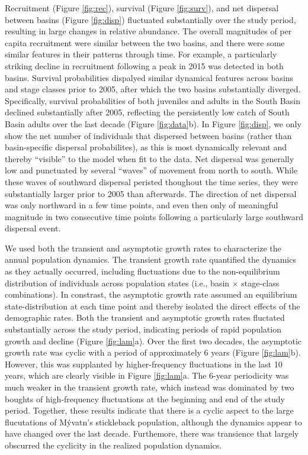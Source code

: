 \documentclass[11pt]{article}
\begin{document}
Recruitment (Figure \ref{fig:rec}), 
survival (Figure \ref{fig:surv}), 
and net dispersal between basins (Figure \ref{fig:disp})
fluctuated substantially over the study period,
resulting in large changes in relative abundance. 
The overall magnitudes of per capita recruitment were similar between the two basins,
and there were some similar features in their patterns through time.
For example, a particularly striking decline in recruitment following a peak in 2015
was detected in both basins.
Survival probabilities dispalyed similar dynamical features 
across basins and stage classes prior to 2005,
after which the two basins substantially diverged.
Specifically, survival probabilities of both juveniles and adults in the South Basin
declined substantially after 2005, 
reflecting the persistently low catch of South Basin adults over the last decade 
(Figure \ref{fig:data}b).
In Figure \ref{fig:disp}, we only show the net number of individuals
that dispersed between basins (rather than basin-specific dispersal probabilites),
as this is most dynamically relevant and thereby ``visible'' to the model when fit to the data.
Net dispersal was generally low and punctuated by several ``waves'' of movement from 
north to south. 
While these waves of southward dispersal peristed thoughout the time series,
they were substantially larger prior to 2005 than afterwards.
The direction of net dispersal was only northward in a few time points, 
and even then only of meaningful magnitude in two consecutive time points 
following a particularly large southward dispersal event.

We used both the transient and asymptotic growth rates 
to characterize the annual population dynamics.
The transient growth rate quantified the dynamics as they actually occurred,
including fluctuations due to the non-equilibrium distribution of individuals across 
population states (i.e., basin $\times$ stage-class combinations).
In constrast, the asymptotic growth rate assumed an equilibrium state-distribution 
at each time point and thereby isolated the direct effects of the demographic rates.
Both the transient and asymptotic growth rates fluctated substantially across the study period, 
indicating periods of rapid population growth and decline (Figure \ref{fig:lam}a).
Over the first two decades, 
the asymptotic growth rate was cyclic with a period of approximately 6 years
(Figure \ref{fig:lam}b).
However, this was supplanted by higher-frequency fluctuations in the last 10 years,
which are clearly visible in Figure \ref{fig:lam}a.
The 6-year periodicity was much weaker in the transient growth rate,
which instead was dominated by two boughts of high-frequency fluctuations
at the beginning and end of the study period.
Together, these results indicate that there is a cyclic aspect to the large flucutations 
of M\'{y}vatn's stickleback population, 
although the dynamics appear to have changed over the last decade.
Furthemore, there was transience 
that largely obscurred the cyclicity in the realized population dynamics.
\end{document}
